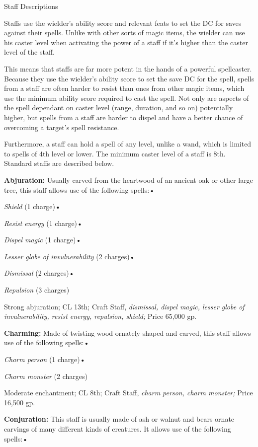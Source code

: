 \documentclass{article}
\begin{document}
\vspace{12pt}
Staff Descriptions

Staffs use the wielder's ability score and relevant feats to set the DC for saves 
against their spells. Unlike with other sorts of magic items, the wielder can use 
his caster level when activating the power of a staff if it's higher than the caster 
level of the staff. 

This means that staffs are far more potent in the hands of a powerful spellcaster. 
Because they use the wielder's ability score to set the save DC for the spell, 
spells from a staff are often harder to resist than ones from other magic items, 
which use the minimum ability score required to cast the spell.  Not only are aspects 
of the spell dependant on caster level (range, duration, and so on) potentially 
higher, but spells from a staff are harder to dispel and have a better chance of 
overcoming a target's spell resistance.

Furthermore, a staff can hold a spell of any level, unlike a wand, which is limited 
to spells of 4th level or lower. The minimum caster level of a staff is 8th. Standard 
staffs are described below.

\textbf{Abjuration:} Usually carved from the heartwood of an ancient oak or other 
large tree, this staff allows use of the following spells:• 

\textit{Shield }(1 charge)• 

\textit{Resist energy }(1 charge)• 

\textit{Dispel magic }(1 charge)• 

\textit{Lesser globe of invulnerability }(2 charges)• 

\textit{Dismissal }(2 charges)• 

\textit{Repulsion }(3 charges)

Strong abjuration; CL 13th; Craft Staff, \textit{dismissal, dispel magic, lesser 
globe of invulnerability, resist energy, repulsion, shield; }Price 65,000 gp.

\textbf{Charming:} Made of twisting wood ornately shaped and carved, this staff 
allows use of the following spells:• 

\textit{Charm person }(1 charge)• 

\textit{Charm monster }(2 charges)

Moderate enchantment; CL 8th; Craft Staff, \textit{charm person, charm monster; 
}Price 16,500 gp.

\textbf{Conjuration:} This staff is usually made of ash or walnut and bears ornate 
carvings of many different kinds of creatures. It allows use of the following spells:• 
\end{document}
